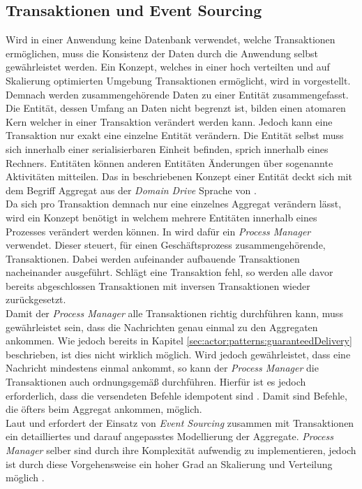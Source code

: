 \subsection{Transaktionen und Event Sourcing}
Wird in einer Anwendung keine Datenbank verwendet, welche Transaktionen ermöglichen, muss die Konsistenz der Daten durch die Anwendung selbst gewährleistet werden. Ein Konzept, welches in einer hoch verteilten und auf Skalierung optimierten Umgebung Transaktionen ermöglicht, wird in \cite{helland2007life} vorgestellt. Demnach werden zusammengehörende Daten zu einer Entität zusammengefasst. Die Entität, dessen Umfang an Daten nicht begrenzt ist, bilden einen atomaren Kern welcher in einer Transaktion verändert werden kann. Jedoch kann eine Transaktion nur exakt eine einzelne Entität verändern. Die Entität selbst muss sich innerhalb einer serialisierbaren Einheit befinden, sprich innerhalb eines Rechners. Entitäten können anderen Entitäten Änderungen über sogenannte Aktivitäten mitteilen. Das in \cite{helland2007life} beschriebenen Konzept einer Entität deckt sich mit dem Begriff Aggregat aus der \textit{Domain Drive} Sprache von \cite{Evans2004Domain-drivenSoftware}. \\
Da sich pro Transaktion demnach nur eine einzelnes Aggregat verändern lässt, wird ein Konzept benötigt in welchem mehrere Entitäten innerhalb eines Prozesses verändert werden können. In \cite{betts2013CQRSEventSourcing} wird dafür ein \textit{Process Manager} verwendet. Dieser steuert, für einen Geschäftsprozess zusammengehörende, Transaktionen. Dabei werden aufeinander aufbauende Transaktionen nacheinander ausgeführt. Schlägt eine Transaktion fehl, so werden alle davor bereits abgeschlossen Transaktionen mit inversen Transaktionen wieder zurückgesetzt. \\
Damit der \textit{Process Manager} alle Transaktionen richtig durchführen kann, muss gewährleistet sein, dass die Nachrichten genau einmal zu den Aggregaten ankommen. Wie jedoch bereits in Kapitel \ref{sec:actor:patterns:guaranteedDelivery} beschrieben, ist dies nicht wirklich möglich. Wird jedoch gewährleistet, dass eine Nachricht mindestens einmal ankommt, so kann der \textit{Process Manager} die Transaktionen auch ordnungsgemäß durchführen. Hierfür ist es jedoch erforderlich, dass die versendeten Befehle idempotent sind \citep{betts2013CQRSEventSourcing}. Damit sind Befehle, die öfters beim Aggregat ankommen, möglich. \\
Laut \cite{betts2013CQRSEventSourcing} und \cite{vernon2013implementing} erfordert der Einsatz von \textit{Event Sourcing} zusammen mit  Transaktionen ein detailliertes und darauf angepasstes Modellierung der Aggregate. \textit{Process Manager} selber sind durch ihre Komplexität aufwendig zu implementieren, jedoch ist durch diese Vorgehensweise ein hoher Grad an Skalierung und Verteilung möglich \cite{helland2007life}.